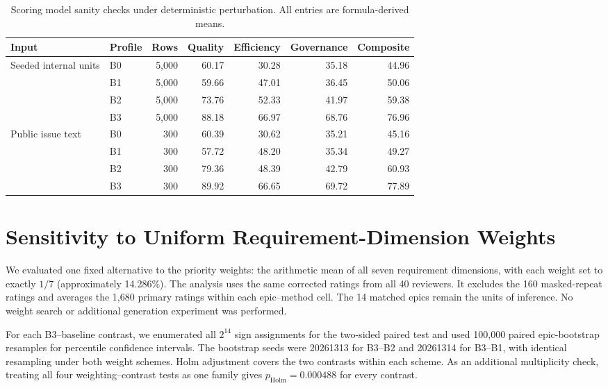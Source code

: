 \documentclass[pdflatex,sn-basic]{sn-jnl}
\begin{document}
\begin{table}[htbp]
\centering
\small
\caption{Scoring model sanity checks under deterministic perturbation. All entries are formula-derived means.}
\label{tab:scoring-sanity-checks}
\begin{tabular}{@{}llrrrrr@{}}
\toprule
Input & Profile & Rows & Quality & Efficiency & Governance & Composite \\
\midrule
Seeded internal units & B0 & 5,000 & 60.17 & 30.28 & 35.18 & 44.96 \\
 & B1 & 5,000 & 59.66 & 47.01 & 36.45 & 50.06 \\
 & B2 & 5,000 & 73.76 & 52.33 & 41.97 & 59.38 \\
 & B3 & 5,000 & 88.18 & 66.97 & 68.76 & 76.96 \\
\midrule
Public issue text & B0 & 300 & 60.39 & 30.62 & 35.21 & 45.16 \\
 & B1 & 300 & 57.72 & 48.20 & 35.34 & 49.27 \\
 & B2 & 300 & 79.36 & 48.39 & 42.79 & 60.93 \\
 & B3 & 300 & 89.92 & 66.65 & 69.72 & 77.89 \\
\bottomrule
\end{tabular}
\end{table}



\section{Sensitivity to Uniform Requirement-Dimension Weights}\label{sec:weight-sensitivity}
We evaluated one fixed alternative to the priority weights: the arithmetic mean of all seven requirement dimensions, with each weight set to exactly $1/7$ (approximately 14.286\%). The analysis uses the same corrected ratings from all 40 reviewers. It excludes the 160 masked-repeat ratings and averages the 1,680 primary ratings within each epic--method cell. The 14 matched epics remain the units of inference. No weight search or additional generation experiment was performed.

For each B3--baseline contrast, we enumerated all $2^{14}$ sign assignments for the two-sided paired test and used 100,000 paired epic-bootstrap resamples for percentile confidence intervals. The bootstrap seeds were 20261313 for B3--B2 and 20261314 for B3--B1, with identical resampling under both weight schemes. Holm adjustment covers the two contrasts within each scheme. As an additional multiplicity check, treating all four weighting--contrast tests as one family gives $p_{\mathrm{Holm}}=0.000488$ for every contrast.
\end{document}
